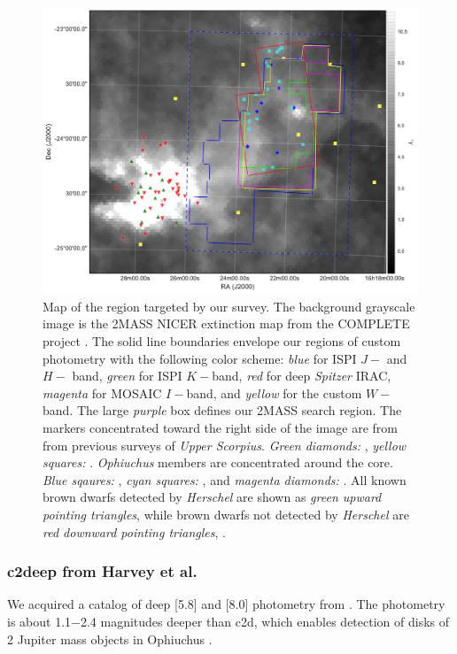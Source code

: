 \begin{figure}[ht!]
\caption{ Map of the region targeted by our survey.  The background grayscale image is the 2MASS NICER extinction map \citep{2008A&A...489..143L} from the COMPLETE project \citep{2006AJ....131.2921R}.  The solid line boundaries envelope our regions of custom photometry with the following color scheme: \emph{blue} for ISPI $J-$ and $H-$ band, \emph{green} for ISPI $K-$band, \emph{red} for deep \emph{Spitzer} IRAC, \emph{magenta} for MOSAIC $I-$band, and \emph{yellow} for the custom $W-$band.  The large \emph{purple} box defines our 2MASS search region.  The markers concentrated toward the right side of the image are from from previous surveys of \emph{Upper Scorpius}. \emph{Green diamonds:} \citet{2012ApJ...758...31L}, \emph{yellow squares:} \cite{2006AJ....131.3016S}.  \emph{Ophiuchus} members are concentrated around the core.  \emph{Blue sqaures:} \cite{2011AJ....142..140E}, \emph{cyan squares:} \cite{2010ApJS..188...75M}, and \emph{magenta diamonds:} \cite{2005AJ....130.1733W}.  All known brown dwarfs detected by \emph{Herschel} are shown as \emph{green upward pointing triangles}, while brown dwarfs not detected by \emph{Herschel} are \emph{red downward pointing triangles}, \cite{2013A&A...559A.126A}. \label{fig_star_chart} }
\centering
\includegraphics[scale=0.5]{chIMACS/figures/Ophiuchus_map}
\end{figure}


\subsubsection{c2deep from Harvey et al.}
We acquired a catalog of deep [5.8] and [8.0] photometry from \citet{2010ApJ...720.1374H}.  The \citet{2010ApJ...720.1374H} photometry is about 1.1$-$2.4 magnitudes deeper than c2d, which enables detection of disks of 2 Jupiter mass objects in Ophiuchus \citep{allers06}.  

